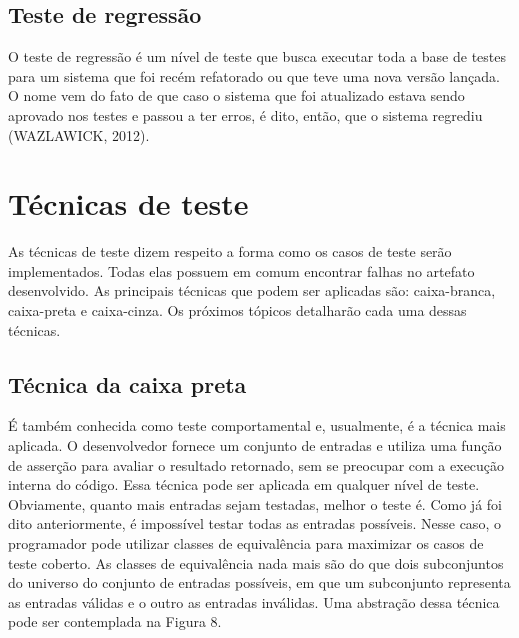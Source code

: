 \documentclass[
    12pt,       %
    openright,      %
    twoside,      %
    a4paper,      %
    english,      %
    french,       %
    spanish,      %
    brazil,       %
    ]{abntex2}
\begin{document}
          \subsection{Teste de regressão}
              O teste de regressão é um nível de teste que busca executar toda a base de
              testes para um sistema que foi recém refatorado ou que teve uma nova versão lançada.
              O nome vem do fato de que caso o sistema que foi atualizado estava sendo aprovado
              nos testes e passou a ter erros, é dito, então, que o sistema regrediu (WAZLAWICK, 2012).

      \section{Técnicas de teste}
          As técnicas de teste dizem respeito a forma como os casos de teste serão implementados.
          Todas elas possuem em comum encontrar falhas no artefato desenvolvido. As principais
          técnicas que podem ser aplicadas são: caixa-branca, caixa-preta e caixa-cinza. Os próximos
          tópicos detalharão cada uma dessas técnicas.

          \subsection{Técnica da caixa preta}
              É também conhecida como teste comportamental e, usualmente, é a técnica mais aplicada.
              O desenvolvedor fornece um conjunto de entradas e utiliza uma função de asserção
              para avaliar o resultado retornado, sem se preocupar com a execução interna do código.
              Essa técnica pode ser aplicada em qualquer nível de teste. Obviamente, quanto mais
              entradas sejam testadas, melhor o teste é. Como já foi dito anteriormente, é
              impossível testar todas as entradas possíveis. Nesse caso, o programador pode utilizar
              classes de equivalência para maximizar os casos de teste coberto. As classes de equivalência
              nada mais são do que dois subconjuntos do universo do conjunto de entradas possíveis,
              em que um subconjunto representa as entradas válidas e o outro as entradas inválidas.
              Uma abstração dessa técnica pode ser contemplada na Figura 8.
\end{document}
